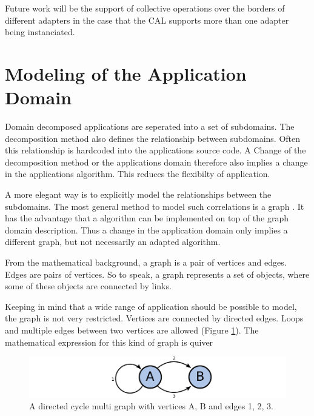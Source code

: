 Future work will be the support of collective operations over the borders
of different adapters in the case that the CAL supports more than one adapter
being instanciated.


\section{Modeling of the Application Domain}
\label{sec:graph}
Domain decomposed applications are seperated into a set of
subdomains. The decomposition method also defines the relationship
between subdomains. Often this relationship is hardcoded into the
applications source code. A Change of the decomposition method or the
applications domain therefore also implies a change in the
applications algorithm. This reduces the flexibilty of application.

A more elegant way is to explicitly model the relationships between
the subdomains. The most general method to model such correlations is
a graph \cite{ref:graph}. It has the advantage that a algorithm can be
implemented on top of the graph domain description. Thus a change in
the application domain only implies a different graph, but not
necessarily an adapted algorithm.

From the mathematical background, a graph is a pair of vertices and
edges. Edges are pairs of vertices. So to speak, a graph represents a
set of objects, where some of these objects are connected by links.

Keeping in mind that a wide range of application should be possible to
model, the graph is not very restricted. Vertices are connected by
directed edges. Loops and multiple edges between two vertices are
allowed (Figure \ref{fig:graph}). The mathematical expression for this
kind of graph is quiver \cite{ref:quiver}

\begin{figure}[H]
  \centering \includegraphics[width=\textwidth]{graphics/30_graph}
  \caption{ A directed cycle multi graph with vertices A, B and edges
    1, 2, 3.  }
  \label{fig:graph}
\end{figure}

